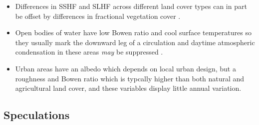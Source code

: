 \begin{enumerate}
\begin{itemize}
		\item Differences in \ac{SSHF} and \ac{SLHF} across different land cover types can in part be offset by differences in fractional vegetation cover \citep{mahmood2011}.
		\item Open bodies of water have low Bowen ratio and cool surface temperatures so they usually mark the downward leg of a circulation and daytime atmospheric condensation in these areas \textit{may} be suppressed \citep{cutrim1995}.
		\item Urban areas have an albedo which depends on local urban design, but a roughness and Bowen ratio which is typcally higher than both natural and agricultural land cover, and these variables display little annual variation.
	\end{itemize}
\end{enumerate}

\subsection{Speculations}
\label{ssec:speculate}

